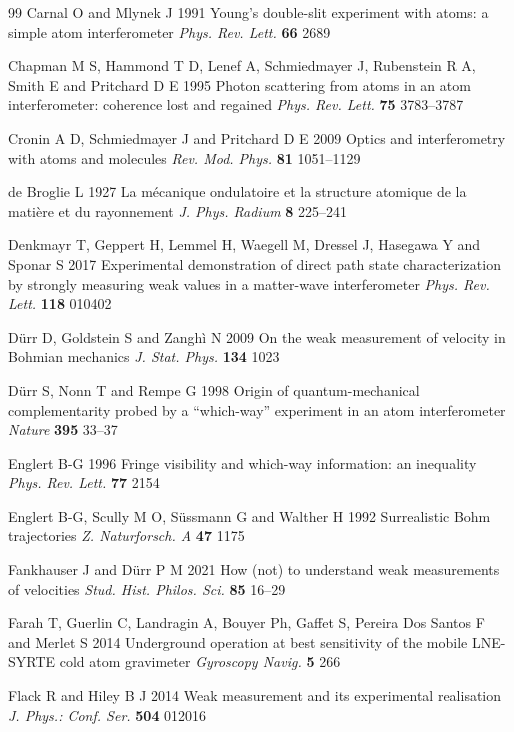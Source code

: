 \documentclass[11pt,a4paper]{article}
\begin{document}
\begin{thebibliography}{99}
Carnal O and Mlynek J 1991 Young's double-slit experiment with atoms: a simple atom interferometer \textit{Phys. Rev. Lett.} \textbf{66} 2689

Chapman M S, Hammond T D, Lenef A, Schmiedmayer J, Rubenstein R A, Smith E and Pritchard D E 1995 Photon scattering from atoms in an atom interferometer: coherence lost and regained \textit{Phys. Rev. Lett.} \textbf{75} 3783--3787

Cronin A D, Schmiedmayer J and Pritchard D E 2009 Optics and interferometry with atoms and molecules \textit{Rev. Mod. Phys.} \textbf{81} 1051--1129

de Broglie L 1927 La m\'ecanique ondulatoire et la structure atomique de la mati\`ere et du rayonnement \textit{J. Phys. Radium} \textbf{8} 225--241

Denkmayr T, Geppert H, Lemmel H, Waegell M, Dressel J, Hasegawa Y and Sponar S 2017 Experimental demonstration of direct path state characterization by strongly measuring weak values in a matter-wave interferometer \textit{Phys. Rev. Lett.} \textbf{118} 010402

D\"urr D, Goldstein S and Zangh\`i N 2009 On the weak measurement of velocity in Bohmian mechanics \textit{J. Stat. Phys.} \textbf{134} 1023

D\"urr S, Nonn T and Rempe G 1998 Origin of quantum-mechanical complementarity probed by a ``which-way'' experiment in an atom interferometer \textit{Nature} \textbf{395} 33--37

Englert B-G 1996 Fringe visibility and which-way information: an inequality \textit{Phys. Rev. Lett.} \textbf{77} 2154

Englert B-G, Scully M O, S\"ussmann G and Walther H 1992 Surrealistic Bohm trajectories \textit{Z. Naturforsch. A} \textbf{47} 1175

Fankhauser J and D\"urr P M 2021 How (not) to understand weak measurements of velocities \textit{Stud. Hist. Philos. Sci.} \textbf{85} 16--29

Farah T, Guerlin C, Landragin A, Bouyer Ph, Gaffet S, Pereira Dos Santos F and Merlet S 2014 Underground operation at best sensitivity of the mobile LNE-SYRTE cold atom gravimeter \textit{Gyroscopy Navig.} \textbf{5} 266

Flack R and Hiley B J 2014 Weak measurement and its experimental realisation \textit{J. Phys.: Conf. Ser.} \textbf{504} 012016


\end{thebibliography}
\end{document}

